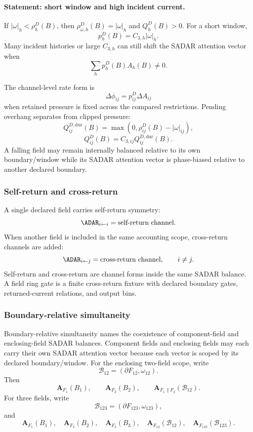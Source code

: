 \paragraph{Statement: short window and high incident current.}
If \(|\omega|_h<\rho^D_h(B)\), then \(\rho^D_{\omega,h}(B)=|\omega|_h\) and \(Q^D_h(B)>0\). For a short window,
\[
p^D_h(B)=C_{3,h}|\omega|_h.
\]
Many incident histories or large \(C_{3,h}\) can still shift the SADAR attention vector when
\[
\sum_h p^D_h(B)A_h(B)\ne0.
\]

The channel-level rate form is
\[
\Delta\phi_{ij}=p^D_{ij}\Delta A_{ij}
\]
when retained pressure is fixed across the compared restrictions. Pending overhang separates from clipped pressure:
\begin{equation}
Q^{D,\mathrm{dur}}_{ij}(B)=\max\!\left(0,\rho^D_{ij}(B)-|\omega|_{ij}\right),
\label{eq:duration-overhang}
\end{equation}
\begin{equation}
Q^D_{ij}(B)=C_{3,ij}Q^{D,\mathrm{dur}}_{ij}(B).
\label{eq:burden-overhang}
\end{equation}
A falling field may remain internally balanced relative to its own boundary/window while its SADAR attention vector is phase-biased relative to another declared boundary.

\subsubsection{Self-return and cross-return}
\label{subsec:self-cross-return}
A single declared field carries self-return symmetry:
\[
\ADAR_{i\leftarrow i}=\text{self-return channel}.
\]
When another field is included in the same accounting scope, cross-return channels are added:
\[
\ADAR_{i\leftarrow j}=\text{cross-return channel},\qquad i\ne j.
\]
Self-return and cross-return are channel forms inside the same SADAR balance. A field ring gate is a finite cross-return fixture with declared boundary gates, returned-current relations, and output bins.

\subsubsection{Boundary-relative simultaneity}
\label{subsec:boundary-relative-simultaneity}
Boundary-relative simultaneity names the coexistence of component-field and enclosing-field SADAR balances. Component fields and enclosing fields may each carry their own SADAR attention vector because each vector is scoped by its declared boundary/window. For the enclosing two-field scope, write
\[
\mathcal{B}_{12}=(\partial F_{12},\omega_{12}).
\]
Then
\[
\mathbf A_{F_1}(B_1),
\qquad
\mathbf A_{F_2}(B_2),
\qquad
\mathbf A_{F_1\parallel F_2}(\mathcal{B}_{12}).
\]
For three fields, write
\[
\mathcal{B}_{123}=(\partial F_{123},\omega_{123}),
\]
and
\[
\mathbf A_{F_1}(B_1),\quad
\mathbf A_{F_2}(B_2),\quad
\mathbf A_{F_3}(B_3),\quad
\mathbf A_{F_{12}}(\mathcal{B}_{12}),\quad
\mathbf A_{F_{123}}(\mathcal{B}_{123}).
\]

